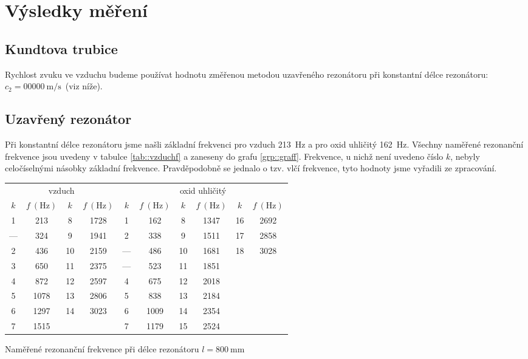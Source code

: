 \section*{Výsledky měření}
\subsection*{Kundtova trubice}
Rychlost zvuku ve vzduchu budeme používat hodnotu změřenou metodou uzavřeného rezonátoru při konstantní délce rezonátoru: $c_2 = \SI{00000}{\m\per\s}$~(viz níže).








\subsection*{Uzavřený rezonátor}
Při konstantní délce rezonátoru jsme našli základní frekvenci pro vzduch \SI{213}{\Hz} a pro oxid uhličitý \SI{162}{\Hz}.
Všechny naměřené rezonanční frekvence jsou uvedeny v tabulce \ref{tab::vzduchf} a zaneseny do grafu \ref{grp::graff}.
Frekvence, u nichž není uvedeno číslo $k$, nebyly celočíselnými násobky základní frekvence.
Pravděpodobně se jednalo o tzv. vlčí frekvence, tyto hodnoty jsme vyřadili ze zpracování.


\begin{tabulka}[htbp]
\centering
\begin{tabular}{cc|cc||cc|cc|cc}
\multicolumn{4}{c||}{vzduch} & \multicolumn{6}{c}{oxid uhličitý} \\
$k$ & $f~(\si{\Hz})$ & $k$ & $f~(\si{\Hz})$ & $k$ & $f~(\si{\Hz})$ & $k$ & $f~(\si{\Hz})$ & $k$ & $f~(\si{\Hz})$\\ \hline
1 & 213 & 8 & 1728 & 1 & 162 & 8 & 1347 & 16 & 2692 \\
--- & 324 & 9 & 1941 & 2 & 338 & 9 & 1511 & 17 & 2858 \\
2 & 436 & 10 & 2159 & --- & 486 & 10 & 1681 & 18 & 3028 \\
3 & 650 & 11 & 2375 & --- & 523 & 11 & 1851 & & \\
4 & 872 & 12 & 2597 & 4 & 675 & 12 & 2018 & & \\
5 & 1078 & 13 & 2806 & 5 & 838 & 13 & 2184 & & \\
6 & 1297 & 14 & 3023 & 6 & 1009 & 14 & 2354 & & \\
7 & 1515 & & & 7 & 1179 & 15 & 2524 & & \\
\end{tabular}
\caption{Naměřené rezonanční frekvence při délce rezonátoru $l=\SI{800}{\mm}$}
\label{tab::vzduchf}
\end{tabulka}






